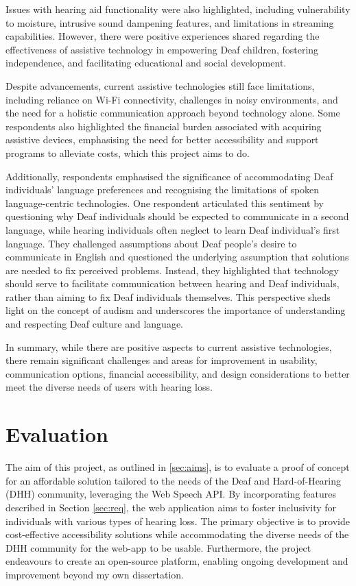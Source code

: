 \documentclass{l4proj}
\begin{document}
Issues with hearing aid functionality were also highlighted, including vulnerability to moisture, intrusive sound dampening features, and limitations in streaming capabilities. However, there were positive experiences shared regarding the effectiveness of assistive technology in empowering Deaf children, fostering independence, and facilitating educational and social development.

Despite advancements, current assistive technologies still face limitations, including reliance on Wi-Fi connectivity, challenges in noisy environments, and the need for a holistic communication approach beyond technology alone. Some respondents also highlighted the financial burden associated with acquiring assistive devices, emphasising the need for better accessibility and support programs to alleviate costs, which this project aims to do.

Additionally, respondents emphasised the significance of accommodating Deaf individuals' language preferences and recognising the limitations of spoken language-centric technologies. One respondent articulated this sentiment by questioning why Deaf individuals should be expected to communicate in a second language, while hearing individuals often neglect to learn Deaf individual's first language. They challenged assumptions about Deaf people's desire to communicate in English and questioned the underlying assumption that solutions are needed to fix perceived problems. Instead, they highlighted that technology should serve to facilitate communication between hearing and Deaf individuals, rather than aiming to fix Deaf individuals themselves. This perspective sheds light on the concept of audism and underscores the importance of understanding and respecting Deaf culture and language.

In summary, while there are positive aspects to current assistive technologies, there remain significant challenges and areas for improvement in usability, communication options, financial accessibility, and design considerations to better meet the diverse needs of users with hearing loss.


\chapter{Evaluation} 
\label{sec:evaluation}

The aim of this project, as outlined in \ref{sec:aims}, is to evaluate a proof of concept for an affordable solution tailored to the needs of the Deaf and Hard-of-Hearing (DHH) community, leveraging the Web Speech API. By incorporating features described in Section \ref{sec:req}, the web application aims to foster inclusivity for individuals with various types of hearing loss. The primary objective is to provide cost-effective accessibility solutions while accommodating the diverse needs of the DHH community for the web-app to be usable. Furthermore, the project endeavours to create an open-source platform, enabling ongoing development and improvement beyond my own dissertation.
\end{document}
